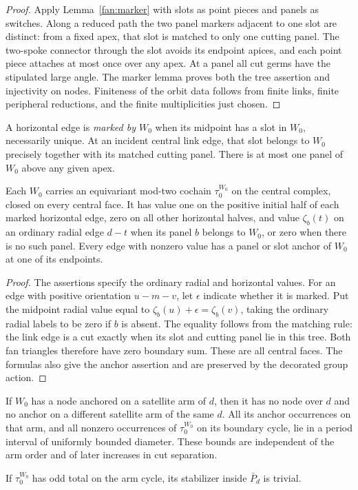 \begin{proof}
Apply Lemma~\ref{fan:marker} with slots as point pieces and panels as
switches.  Along a reduced path the two panel markers adjacent to one
slot are distinct: from a fixed apex, that slot is matched to only one
cutting panel.  The two-spoke connector through the slot avoids its
endpoint apices, and each point piece attaches at most once over any
apex.  At a panel all cut germs have the stipulated large angle.
The marker lemma proves both the tree assertion and injectivity on
nodes.  Finiteness of the orbit data follows from finite links, finite
peripheral reductions, and the finite multiplicities just chosen.
\end{proof}

A horizontal edge is \emph{marked by $W_0$} when its midpoint has a
slot in $W_0$, necessarily unique.  At an incident central link edge,
that slot belongs to $W_0$ precisely together with its matched cutting
panel.  There is at most one panel of $W_0$ above any given apex.

\begin{lemma}\label{fan:central-cochain}
Each $W_0$ carries an equivariant mod-two cochain $\tau_0^{W_0}$ on the
central complex, closed on every central face.  It has value one on
the positive initial half of each marked horizontal edge, zero on all
other horizontal halves, and value $\zeta_b(t)$ on an ordinary radial
edge $d\!-\!t$ when its panel $b$ belongs to $W_0$, or zero when there
is no such panel.  Every edge with nonzero value has a panel or slot
anchor of $W_0$ at one of its endpoints.
\end{lemma}

\begin{proof}
The assertions specify the ordinary radial and horizontal values.
For an edge with positive orientation $u\!-\!m\!-\!v$, let
$\epsilon$ indicate whether it is marked.  Put the midpoint radial
value equal to $\zeta_b(u)+\epsilon=\zeta_b(v)$, taking the ordinary
radial labels to be zero if $b$ is absent.  The equality follows from
the matching rule: the link edge is a cut exactly when its slot and
cutting panel lie in this tree.  Both fan triangles therefore have
zero boundary sum.  These are all central faces.  The formulas also
give the anchor assertion and are preserved by the decorated group
action.
\end{proof}

\begin{lemma}
\label{fan:arm-exclusivity}
If $W_0$ has a node anchored on a satellite arm of $d$, then it has no
node over $d$ and no anchor on a different satellite arm of the same
$d$.  All its anchor occurrences on that arm, and all nonzero
occurrences of $\tau_0^{W_0}$ on its boundary cycle, lie in a period
interval of uniformly bounded diameter.  These bounds are independent
of the arm order and of later increases in cut separation.

If $\tau_0^{W_0}$ has odd total on the arm cycle, its stabilizer inside
$\bar P_d$ is trivial.
\end{lemma}

